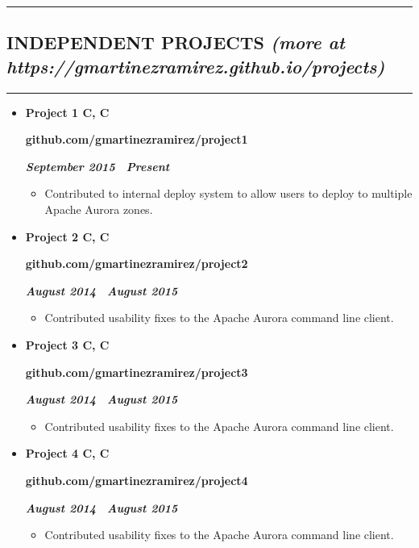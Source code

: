 \documentclass[10pt,letterpaper]{article}
\newcommand{\textbox}[1]{
  \parbox{.333\textwidth}{#1}
}
\newcommand{\CPP}
{C\nolinebreak[4]\hspace{-.05em}\raisebox{.22ex}{\footnotesize\bf ++}}
\newcommand{\sectionTitleWithWeb}[2]{
  \hrule
  \vspace{-1.0em} 
  \subsection*{\uppercase{\textbf{#1}} \hfill{\small \textit{(more at #2)}}}
  \vspace{-0.3em}
  \hrule
  \vspace{0.3em}  
}
\newcommand{\titleExperienceWithoutLocation}[4]{
  \vspace{1.0em}
  \item[]
  {
    \textbox{\textbf{#1}\hfill}\textbox{\hfil \textbf{#2}\hfil}\hfill \textbf{\emph{#3 \textendash \ #4}}
  }
}
\begin{document}
  \sectionTitleWithWeb{Independent Projects}{https://gmartinezramirez.github.io/projects}
  \vspace{-0.9em}
  \begin{itemize}
    \parskip=-0.6em 
    \titleExperienceWithoutLocation{Project 1 \quad C, \CPP}{github.com/gmartinezramirez/project1}{September 2015}{Present}
      \begin{itemize}[label=\textbullet]
        \itemsep0em
        \item Contributed to internal deploy system to allow users to deploy to multiple Apache Aurora zones.
      \end{itemize}
  
    \vspace{-0.6em} 
    \titleExperienceWithoutLocation{Project 2 \quad C, \CPP}{github.com/gmartinezramirez/project2}{August 2014}{August 2015}
      \begin{itemize}[label=\textbullet]
        \itemsep0em
        \item Contributed usability fixes to the Apache Aurora command line client.
      \end{itemize}

    \vspace{-0.6em} 
    \titleExperienceWithoutLocation{Project 3 \quad C, \CPP}{github.com/gmartinezramirez/project3}{August 2014}{August 2015}
      \begin{itemize}[label=\textbullet]
        \itemsep0em
        \item Contributed usability fixes to the Apache Aurora command line client.
      \end{itemize}
    \vspace{-0.6em} 
    \titleExperienceWithoutLocation{Project 4 \quad C, \CPP}{github.com/gmartinezramirez/project4}{August 2014}{August 2015}
    \begin{itemize}[label=\textbullet]
      \itemsep0em
      \item Contributed usability fixes to the Apache Aurora command line client.
    \end{itemize}
  \end{itemize}
\end{document}

